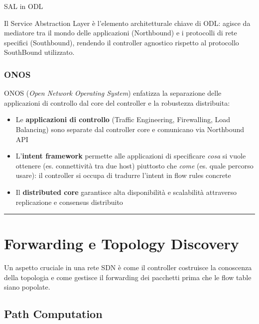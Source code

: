 \documentclass[
  italian,
  openany]{book}
\providecommand{\tightlist}{%
  \setlength{\itemsep}{0pt}\setlength{\parskip}{0pt}}
\begin{document}
\begin{callouttip}{SAL in ODL}

Il Service Abstraction Layer è l'elemento architetturale chiave di ODL:
agisce da mediatore tra il mondo delle applicazioni (Northbound) e i
protocolli di rete specifici (Southbound), rendendo il controller
agnostico rispetto al protocollo SouthBound utilizzato.

\end{callouttip}

\subsubsection{ONOS}\label{onos}

ONOS (\emph{Open Network Operating System}) enfatizza la separazione
delle applicazioni di controllo dal core del controller e la robustezza
distribuita:

\begin{itemize}
\tightlist
\item
  Le \textbf{applicazioni di controllo} (Traffic Engineering,
  Firewalling, Load Balancing) sono separate dal controller core e
  comunicano via Northbound API
\item
  L'\textbf{intent framework} permette alle applicazioni di specificare
  \emph{cosa} si vuole ottenere (es. connettività tra due host)
  piuttosto che \emph{come} (es. quale percorso usare): il controller si
  occupa di tradurre l'intent in flow rules concrete
\item
  Il \textbf{distributed core} garantisce alta disponibilità e
  scalabilità attraverso replicazione e consensus distribuito
\end{itemize}

\begin{center}\rule{0.5\linewidth}{0.5pt}\end{center}

\section{Forwarding e Topology
Discovery}\label{forwarding-e-topology-discovery}

Un aspetto cruciale in una rete SDN è come il controller costruisce la
conoscenza della topologia e come gestisce il forwarding dei pacchetti
prima che le flow table siano popolate.

\subsection{Path Computation}\label{path-computation}
\end{document}
